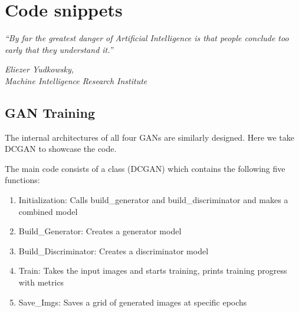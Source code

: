 {\chapter{Code snippets}\label{ch:scope}}
\epigraph{\textit{\normalsize “By far the greatest danger of Artificial Intelligence is that people conclude too early that they understand it.”}}{\textit{ \normalsize Eliezer Yudkowsky,\\ Machine Intelligence Research Institute}}


\section{GAN Training} %
\label{sec:gan_training}
The internal architectures of all four GANs are similarly designed. Here we take DCGAN to showcase the code.

\par\bigskip 
The main code consists of a class (DCGAN) which contains the following five functions:
\par\bigskip

\begin{enumerate}
    \item Initialization: Calls build\_generator and build\_discriminator and makes a combined model
    \item Build\_Generator: Creates a generator model
    \item Build\_Discriminator: Creates a discriminator model
    \item Train: Takes the input images and starts training, prints training progress with metrics
    \item Save\_Imgs: Saves a grid of generated images at specific epochs
\end{enumerate}

